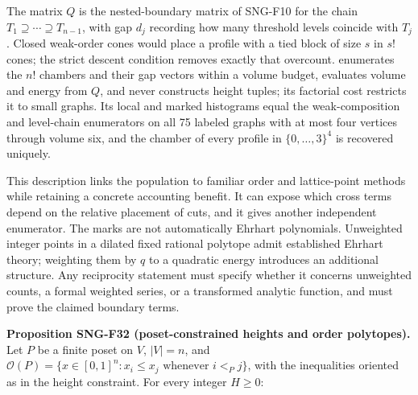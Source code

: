 \documentclass[
  11pt,
  a4paper,
]{report}
\let\singularitytexttt\texttt
\renewcommand{\texttt}[1]{\singularitytexttt{\seqsplit{#1}}}
\begin{document}
The matrix \(Q\) is the nested-boundary matrix of SNG-F10 for the chain
\(T_1\supseteq\cdots\supseteq T_{n-1}\), with gap \(d_j\) recording how
many threshold levels coincide with \(T_j\). Closed weak-order cones
would place a profile with a tied block of size \(s\) in \(s!\) cones;
the strict descent condition removes exactly that overcount.
\texttt{src/singularity/chambers.py} enumerates the \(n!\) chambers and
their gap vectors within a volume budget, evaluates volume and energy
from \(Q\), and never constructs height tuples; its factorial cost
restricts it to small graphs. Its local and marked histograms equal the
weak-composition and level-chain enumerators on all 75 labeled graphs
with at most four vertices through volume six, and the chamber of every
profile in \(\{0,\ldots,3\}^4\) is recovered uniquely.

This description links the population to familiar order and
lattice-point methods while retaining a concrete accounting benefit. It
can expose which cross terms depend on the relative placement of cuts,
and it gives another independent enumerator. The marks are not
automatically Ehrhart polynomials. Unweighted integer points in a
dilated fixed rational polytope admit established Ehrhart theory;
weighting them by \(q\) to a quadratic energy introduces an additional
structure. Any reciprocity statement must specify whether it concerns
unweighted counts, a formal weighted series, or a transformed analytic
function, and must prove the claimed boundary terms.

\textbf{Proposition SNG-F32 (poset-constrained heights and order
polytopes).} Let \(P\) be a finite poset on \(V\), \(|V|=n\), and
\(\mathcal O(P)=\{x\in[0,1]^n:x_i\le x_j\text{ whenever }i<_Pj\}\), with
the inequalities oriented as in the height constraint. For every integer
\(H\ge0\):
\end{document}
